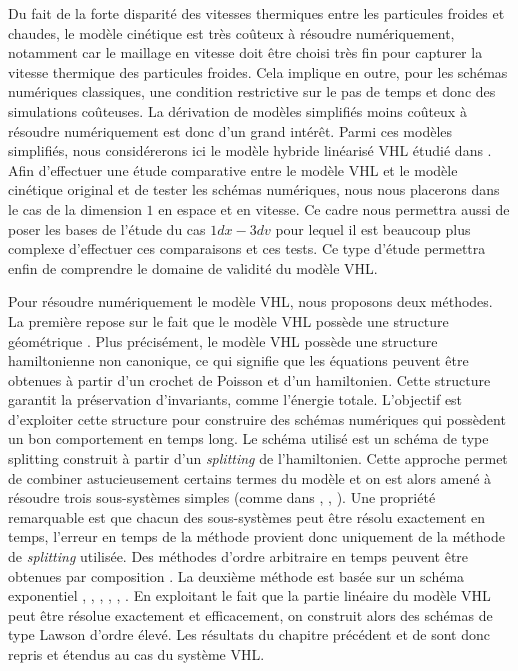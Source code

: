 Du fait de la forte disparité des vitesses thermiques entre les particules froides et chaudes, le modèle cinétique est très coûteux à résoudre numériquement, notamment car le maillage en vitesse doit être choisi très fin pour capturer la vitesse thermique des particules froides. Cela implique en outre, pour les schémas numériques classiques, une condition restrictive sur le pas de temps et donc des simulations coûteuses. La dérivation de modèles simplifiés moins coûteux à résoudre numériquement est donc d'un grand intérêt. Parmi ces modèles simplifiés, nous considérerons ici le modèle hybride linéarisé VHL étudié dans \cite{Holderied:2019}. Afin d'effectuer une étude comparative entre le modèle VHL et le modèle cinétique original et de tester les schémas numériques, nous nous placerons dans le cas de la dimension $1$ en espace et en vitesse. Ce cadre nous permettra aussi de poser les bases de l'étude du cas $1dx-3dv$ pour lequel il est beaucoup plus complexe d'effectuer ces comparaisons et ces tests. Ce type d'étude permettra enfin de comprendre le domaine de validité du modèle VHL.

Pour résoudre numériquement le modèle VHL, nous proposons deux méthodes. La première repose sur le fait que le modèle VHL possède une structure géométrique \cite{Morrison:2017}\cite{Tronci:2010} \cite{Tronci:2014}. Plus précisément, le modèle VHL possède une structure hamiltonienne non canonique, ce qui signifie que les équations peuvent être obtenues à partir d'un crochet de Poisson et d'un hamiltonien. Cette structure garantit la préservation d'invariants, comme l'énergie totale. L'objectif est d'exploiter cette structure pour construire des schémas numériques qui possèdent un bon comportement en temps long. Le schéma utilisé est un schéma de type splitting construit à partir d'un \emph{splitting} de l'hamiltonien. Cette approche permet de combiner astucieusement certains termes du modèle et on est alors amené à résoudre trois sous-systèmes simples (comme dans \cite{Crouseilles:2015}, \cite{Casas:2017}, \cite{Li:2020}). Une propriété remarquable est que chacun des sous-systèmes peut être résolu exactement en temps, l'erreur en temps de la méthode provient donc uniquement de la méthode de \emph{splitting} utilisée. Des méthodes d'ordre arbitraire en temps peuvent être obtenues par composition \cite{Hairer:2006}. La deuxième méthode est basée sur un schéma exponentiel \cite{Hochbruck:2010}, \cite{Hochbruck:2005}, \cite{Lawson:1967a}, \cite{Isherwood:2018}, \cite{Lawson:1967}, \cite{Crouseilles:2019b}. En exploitant le fait que la partie linéaire du modèle VHL peut être résolue exactement et efficacement, on construit alors des schémas de type Lawson d'ordre élevé. Les résultats du chapitre précédent et de \cite{Crouseilles:2019b} sont donc repris et étendus au cas du système VHL. 

